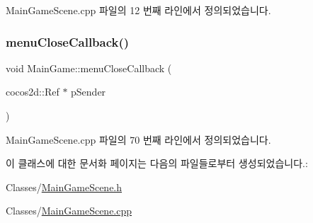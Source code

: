 Main\+Game\+Scene.\+cpp 파일의 12 번째 라인에서 정의되었습니다.

\mbox{\label{class_main_game_a824206defd2b5af2359c3699aa55e289}} 
\subsubsection{\texorpdfstring{menu\+Close\+Callback()}{menuCloseCallback()}}
{\footnotesize\ttfamily void Main\+Game\+::menu\+Close\+Callback (\begin{DoxyParamCaption}\item[{cocos2d\+::\+Ref $\ast$}]{p\+Sender }\end{DoxyParamCaption})}



Main\+Game\+Scene.\+cpp 파일의 70 번째 라인에서 정의되었습니다.



이 클래스에 대한 문서화 페이지는 다음의 파일들로부터 생성되었습니다.\+:\begin{DoxyCompactItemize}
\item 
Classes/\hyperlink{_main_game_scene_8h}{Main\+Game\+Scene.\+h}\item 
Classes/\hyperlink{_main_game_scene_8cpp}{Main\+Game\+Scene.\+cpp}\end{DoxyCompactItemize}
